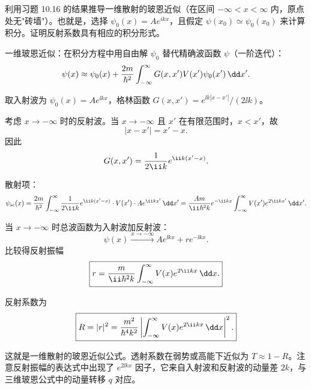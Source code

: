\begin{question}
利用习题 10.16 的结果推导一维散射的玻恩近似（在区间 $-\infty<x<\infty$ 内，原点处无"砖墙"）。也就是，选择 $\psi_0(x)=Ae^{ikx}$，且假定 $\psi(x_0)\simeq\psi_0(x_0)$ 来计算积分。证明反射系数具有相应的积分形式。
\end{question}
\begin{solution}
一维玻恩近似：在积分方程中用自由解 $\psi_0$ 替代精确波函数 $\psi$（一阶迭代）：
\[
\psi(x)\approx\psi_0(x)+{2m\over\hbar^2}\int_{-\infty}^{\infty}G(x,x')V(x')\psi_0(x')\,\dd x'.
\]

取入射波为 $\psi_0(x)=Ae^{\ii kx}$，格林函数 $G(x,x')=e^{\ii k|x-x'|}/(2\ii k)$。

考虑 $x\to-\infty$ 时的反射波。当 $x\to-\infty$ 且 $x'$ 在有限范围时，$x<x'$，故
\[
|x-x'|=x'-x.
\]
因此
\[
G(x,x')={1\over2\ii k}e^{\ii k(x'-x)}.
\]

散射项：
\[
\psi_{\text{sc}}(x)={2m\over\hbar^2}\int_{-\infty}^{\infty}{1\over2\ii k}e^{\ii k(x'-x)}\cdot V(x')\cdot Ae^{\ii kx'}\,\dd x'
={Am\over\ii\hbar^2k}e^{-\ii kx}\int_{-\infty}^{\infty}V(x')e^{2\ii kx'}\,\dd x'.
\]

当 $x\to-\infty$ 时总波函数为入射波加反射波：
\[
\psi(x)\xrightarrow{x\to-\infty} Ae^{\ii kx}+re^{-\ii kx}.
\]
比较得反射振幅
\[
\boxed{r={m\over\ii\hbar^2k}\int_{-\infty}^{\infty}V(x)e^{2\ii kx}\,\dd x.}
\]

反射系数为
\[
\boxed{R=|r|^2={m^2\over\hbar^4k^2}\left|\int_{-\infty}^{\infty}V(x)e^{2\ii kx}\,\dd x\right|^2.}
\]

这就是一维散射的玻恩近似公式。透射系数在弱势或高能下近似为 $T\approx 1-R$。注意反射振幅的表达式中出现了 $e^{2\ii kx}$ 因子，它来自入射波和反射波的动量差 $2k$，与三维玻恩公式中的动量转移 $q$ 对应。
\end{solution}

